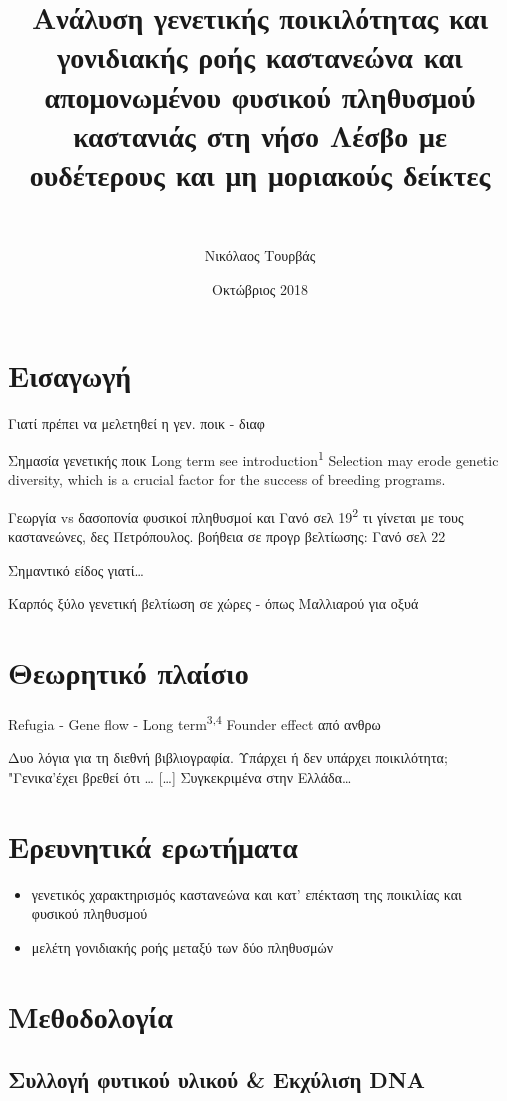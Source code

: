 \documentclass[12pt,a4paper,]{report}
\title{Ανάλυση γενετικής ποικιλότητας και γονιδιακής ροής καστανεώνα και
απομονωμένου φυσικού πληθυσμού καστανιάς στη νήσο Λέσβο με ουδέτερους
και μη μοριακούς δείκτες}
\subtitle{~}
\author{Νικόλαος Τουρβάς}
\date{Οκτώβριος 2018}
\providecommand{\tightlist}{%
  \setlength{\itemsep}{0pt}\setlength{\parskip}{0pt}}
\begin{document}
\maketitle

\section{Εισαγωγή}

Γιατί πρέπει να μελετηθεί η γεν. ποικ - διαφ

Σημασία γενετικής ποικ Long term see introduction\textsuperscript{1}
Selection may erode genetic diversity, which is a crucial factor for the
success of breeding programs.

Γεωργία vs δασοπονία φυσικοί πληθυσμοί και Γανό σελ
19\textsuperscript{2} τι γίνεται με τους καστανεώνες, δες Πετρόπουλος.
βοήθεια σε προγρ βελτίωσης: Γανό σελ 22

Σημαντικό είδος γιατί\ldots{}

Καρπός ξύλο γενετική βελτίωση σε χώρες - όπως Μαλλιαρού για οξυά

\hypertarget{-}{%
\section{Θεωρητικό πλαίσιο}\label{-}}

Refugia - Gene flow - Long term\textsuperscript{3,4} Founder effect από
ανθρω

Δυο λόγια για τη διεθνή βιβλιογραφία. Υπάρχει ή δεν υπάρχει ποικιλότητα;
"Γενικα'έχει βρεθεί ότι \ldots{} {[}\ldots{}{]} Συγκεκριμένα στην
Ελλάδα\ldots{}

\hypertarget{-}{%
\section{Ερευνητικά ερωτήματα}\label{-}}

\begin{itemize}
\tightlist
\item
  γενετικός χαρακτηρισμός καστανεώνα και κατ' επέκταση της ποικιλίας και
  φυσικού πληθυσμού
\item
  μελέτη γονιδιακής ροής μεταξύ των δύο πληθυσμών
\end{itemize}

\section{Μεθοδολογία}

\hypertarget{----dna}{%
\subsection{Συλλογή φυτικού υλικού \& Εκχύλιση DNA}\label{----dna}}
\end{document}
